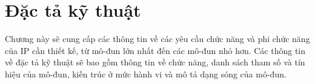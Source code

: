 \clearpage
{}

\setcounter{chapter}{1}
\chapter[{ĐẶC TẢ KỸ THUẬT}]{Đặc tả kỹ thuật}

Chương này sẽ cung cấp các thông tin về các yêu cầu chức năng và phi chức năng của IP cần thiết kế, từ mô-đun lớn nhất đến các mô-đun nhỏ hơn. Các thông tin về đặc tả kỹ thuật sẽ bao gồm thông tin về chức năng, danh sách tham số và tín hiệu của mô-đun, kiến trúc ở mức hành vi và mô tả dạng sóng của mô-đun.

